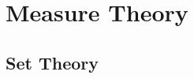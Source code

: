 \documentclass{ctexbook}
\begin{document}
\theoremstyle{definition} 
\newtheorem{define}{Def}[section]

\theoremstyle{plain} 
\newtheorem{thm}{Theorem}[section] \newtheorem{lema}{Lemma}[chapter] \newtheorem{cor}{Corollary}[chapter]
\newtheorem{prop}{Property}[chapter] \newtheorem{fact}{Fact}[chapter] 


\mainmatter
\chapter{Measure Theory}

\section{Set Theory}
\end{document}
